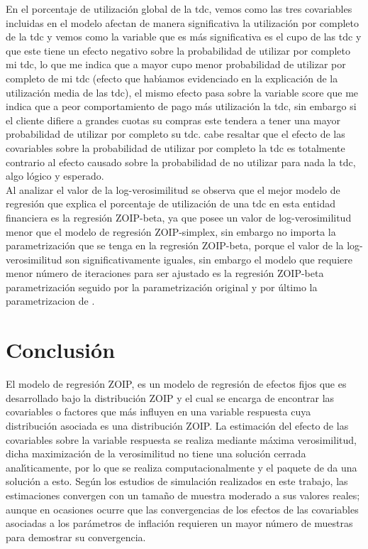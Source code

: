 En el porcentaje de utilizaci\'{o}n global de la tdc, vemos como las tres covariables incluidas en el modelo afectan de manera significativa la utilizaci\'{o}n por completo de la tdc y vemos como la variable que es m\'{a}s significativa es el cupo de las tdc y que este tiene un efecto negativo sobre la probabilidad de utilizar por completo mi tdc, lo que me indica que a mayor cupo menor probabilidad de utilizar por completo de mi tdc (efecto que hab\'{\i}amos evidenciado en la explicaci\'{o}n de la utilizaci\'{o}n media de las tdc), el mismo efecto pasa sobre la variable score que me indica que a peor comportamiento de pago m\'{a}s utilizaci\'{o}n la tdc, sin embargo si el cliente difiere a grandes cuotas su compras este tendera a tener una mayor probabilidad de utilizar por completo su tdc. cabe resaltar que el efecto de las covariables sobre la probabilidad de utilizar por completo la tdc es totalmente contrario al efecto causado sobre la probabilidad de no utilizar para nada la tdc, algo l\'{o}gico y esperado.\\

Al analizar el valor de la log-verosimilitud se observa que el mejor modelo de regresi\'{o}n que explica el porcentaje de utilizaci\'{o}n de una tdc en esta entidad financiera es la regresi\'{o}n ZOIP-beta, ya que posee un valor de log-verosimilitud menor que el modelo de regresi\'{o}n ZOIP-simplex, sin embargo no importa la parametrizaci\'{o}n que se tenga en la regresi\'{o}n ZOIP-beta, porque el valor de la log-verosimilitud son significativamente iguales, sin embargo el modelo que requiere menor n\'{u}mero de iteraciones para ser ajustado es la regresi\'{o}n ZOIP-beta parametrizaci\'{o}n \cite{Ferrari2} seguido por la parametrizaci\'{o}n original y por \'{u}ltimo la parametrizacion de \cite{Stasinopoulos2}.



\section{Conclusi\'{o}n}

El modelo de regresi\'{o}n ZOIP, es un modelo de regresi\'{o}n de efectos fijos que es desarrollado bajo la distribuci\'{o}n ZOIP y el cual se encarga de encontrar las covariables o factores que m\'{a}s influyen en una variable respuesta cuya distribuci\'{o}n asociada es una distribuci\'{o}n ZOIP. La estimaci\'{o}n del efecto de las covariables sobre la variable respuesta se realiza mediante m\'{a}xima verosimilitud, dicha maximizaci\'{o}n de la verosimilitud no tiene una soluci\'{o}n cerrada anal\'{\i}ticamente, por lo que se realiza computacionalmente y el paquete  de  da una soluci\'{o}n a esto. Seg\'{u}n los estudios de simulaci\'{o}n realizados en este trabajo, las estimaciones convergen con un tama\~{n}o de muestra moderado a sus valores reales; aunque en ocasiones ocurre que las convergencias de los efectos de las covariables asociadas a los par\'{a}metros de inflaci\'{o}n requieren un mayor n\'{u}mero de muestras para demostrar su convergencia.\\


